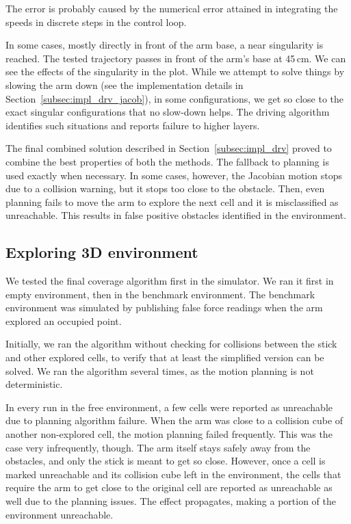 \documentclass[buriama8_dp.tex]{subfiles}
\begin{document}
The error is probably caused by the numerical error attained in integrating the speeds in discrete steps in the control loop.

In some cases, mostly directly in front of the arm base, a near singularity is reached. The tested trajectory passes in front of the arm's base at 45\,cm. We can see the effects of the singularity in the plot. While we attempt to solve things by slowing the arm down (see the implementation details in Section~\ref{subsec:impl_drv_jacob}), in some configurations, we get so close to the exact singular configurations that no slow-down helps. The driving algorithm identifies such situations and reports failure to higher layers.

The final combined solution described in Section~\ref{subsec:impl_drv} proved to combine the best properties of both the methods. The fallback to planning is used exactly when necessary. In some cases, however, the Jacobian motion stops due to a collision warning, but it stops too close to the obstacle. Then, even planning fails to move the arm to explore the next cell and it is misclassified as unreachable. This results in false positive obstacles identified in the environment.

\subsection{Exploring 3D environment}
\label{subsec:sim_arm_cover}

We tested the final coverage algorithm first in the simulator. We ran it first in empty environment, then in the benchmark environment. The benchmark environment was simulated by publishing false force readings when the arm explored an occupied point.

Initially, we ran the algorithm without checking for collisions between the stick and other explored cells, to verify that at least the simplified version can be solved. We ran the algorithm several times, as the motion planning is not deterministic.

In every run in the free environment, a few cells were reported as unreachable due to planning algorithm failure. When the arm was close to a collision cube of another non-explored cell, the motion planning failed frequently. This was the case very infrequently, though. The arm itself stays safely away from the obstacles, and only the stick is meant to get so close. However, once a cell is marked unreachable and its collision cube left in the environment, the cells that require the arm to get close to the original cell are reported as unreachable as well due to the planning issues. The effect propagates, making a portion of the environment unreachable.
\end{document}
